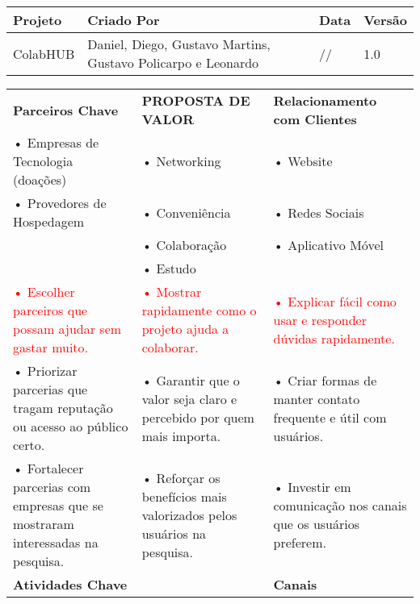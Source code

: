 \documentclass{article}
\newcommand{\hoje}{\number\day/\number\month/\number\year}
\begin{document}
\begin{table}[h!]
\centering
\renewcommand{\arraystretch}{1.3}
\setlength{\tabcolsep}{10pt}
\begin{tabular}{|p{4cm}|p{7cm}|p{3cm}|p{2cm}|}
\hline
\textbf{Projeto} & \textbf{Criado Por} & \textbf{Data} & \textbf{Versão} \\
\hline
ColabHUB & Daniel, Diego, Gustavo Martins, Gustavo Policarpo e Leonardo & \hoje & 1.0 \\
\hline
\end{tabular}
\end{table}

\vspace{0.5cm}

\begin{table}[h!]
\centering
\renewcommand{\arraystretch}{1.8}
\setlength{\tabcolsep}{4pt}
\begin{tabular}{|p{6cm}|p{6cm}|p{6cm}|}
\hline
\rowcolor{lightgray}
\textbf{Parceiros Chave} &
\centering\textbf{PROPOSTA DE VALOR} &
\textbf{Relacionamento com Clientes} \\
\cline{1-1}\cline{2-2}\cline{3-3}
• Empresas de Tecnologia (doações) & • Networking & • Website \\
• Provedores de Hospedagem & • Conveniência & • Redes Sociais \\
& • Colaboração & • Aplicativo Móvel \\
& • Estudo & \\
\textcolor{red}{• Escolher parceiros que possam ajudar sem gastar muito.} &
\textcolor{red}{• Mostrar rapidamente como o projeto ajuda a colaborar.} &
\textcolor{red}{• Explicar fácil como usar e responder dúvidas rapidamente.} \\
\textcolor{blueval}{• Priorizar parcerias que tragam reputação ou acesso ao público certo.} &
\textcolor{blueval}{• Garantir que o valor seja claro e percebido por quem mais importa.} &
\textcolor{blueval}{• Criar formas de manter contato frequente e útil com usuários.} \\
\textcolor{greenval}{• Fortalecer parcerias com empresas que se mostraram interessadas na pesquisa.} &
\textcolor{greenval}{• Reforçar os benefícios mais valorizados pelos usuários na pesquisa.} &
\textcolor{greenval}{• Investir em comunicação nos canais que os usuários preferem.} \\
\hline
\rowcolor{lightgray}
\textbf{Atividades Chave} & & \textbf{Canais} \\

\end{tabular}
\end{table}
\end{document}

